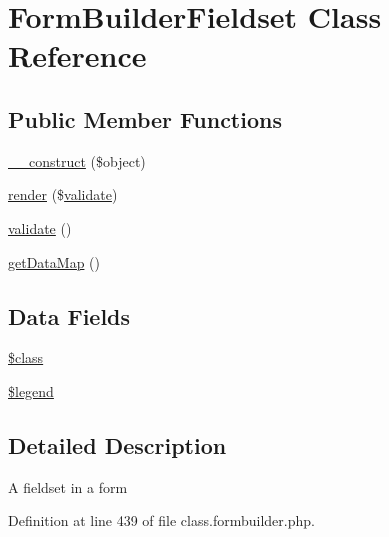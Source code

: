 \hypertarget{class_form_builder_fieldset}{\section{Form\-Builder\-Fieldset Class Reference}
\label{class_form_builder_fieldset}
}
\subsection*{Public Member Functions}
\begin{DoxyCompactItemize}
\item 
\hyperlink{class_form_builder_fieldset_a4c1397393acd678c82288e23931da583}{\-\_\-\-\_\-construct} (\$object)
\item 
\hyperlink{class_form_builder_fieldset_aa4b074485f3cbfcc9f12c3bc806aaba4}{render} (\$\hyperlink{class_form_builder_fieldset_a184909dab34698899937d810a9f5d393}{validate})
\item 
\hyperlink{class_form_builder_fieldset_a184909dab34698899937d810a9f5d393}{validate} ()
\item 
\hyperlink{class_form_builder_fieldset_a0828e6a5b4a68fc77042472bc886ae15}{get\-Data\-Map} ()
\end{DoxyCompactItemize}
\subsection*{Data Fields}
\begin{DoxyCompactItemize}
\item 
\hyperlink{class_form_builder_fieldset_a252ba022809910ea710a068fc1bab657}{\$class}
\item 
\hyperlink{class_form_builder_fieldset_aa5122ec2579420d7ced620e94b516998}{\$legend}
\end{DoxyCompactItemize}


\subsection{Detailed Description}
A fieldset in a form 

Definition at line 439 of file class.\-formbuilder.\-php.



